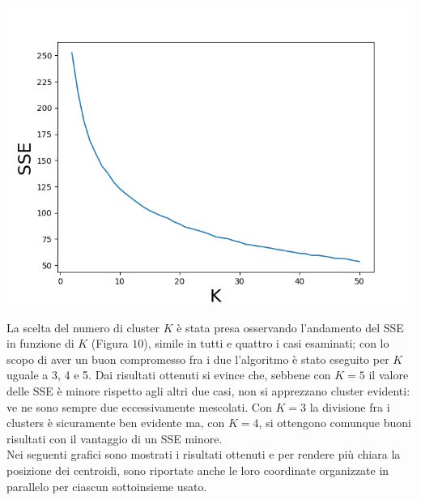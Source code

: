 \documentclass[a4paper,9pt]{article}
\begin{document}
\begin{center}
\includegraphics[scale=0.6]{SSEsub1.png}
\end{center}

La scelta del numero di cluster $K$ è stata presa osservando l'andamento del SSE in funzione di $K$ (Figura $10$), simile in tutti e quattro i casi esaminati; con lo scopo di aver un buon compromesso fra i due l'algoritmo è stato eseguito per $K$ uguale a 3, 4 e 5. Dai risultati ottenuti si evince che, sebbene con $K=5$ il valore delle SSE è minore rispetto agli altri due casi, non si apprezzano cluster evidenti: ve ne sono sempre due eccessivamente mescolati. Con $K=3$ la divisione fra i clusters è sicuramente ben evidente ma, con $K=4$, si ottengono comunque buoni risultati con il vantaggio di un SSE minore. \\
Nei seguenti grafici sono mostrati i risultati ottenuti e per rendere più chiara la posizione dei centroidi, sono riportate anche le loro coordinate organizzate in parallelo per ciascun sottoinsieme usato.
\end{document}
